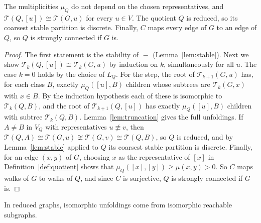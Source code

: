 \documentclass[twoside,leqno]{article}
\newcommand{\Unf}{\mathcal{T}}
\newcommand{\iso}{\cong}
\begin{document}
\begin{lemma}
\label{lem:quotient}
The multiplicities $\mu_Q$ do not depend on the chosen representatives, and $\Unf(Q,[u])\iso\Unf(G,u)$ for every $u \in V$. The quotient $Q$ is reduced, so its coarsest stable partition is discrete. Finally, $C$ maps every edge of $G$ to an edge of $Q$, so $Q$ is strongly connected if $G$ is.
\end{lemma}
\begin{proof}
The first statement is the stability of $\equiv$ (Lemma~\ref{lem:stable}). Next we show $\Unf_k(Q,[u])\iso\Unf_k(G,u)$ by induction on $k$, simultaneously for all $u$. The case $k=0$ holds by the choice of $L_Q$. For the step, the root of $\Unf_{k+1}(G,u)$ has, for each class $B$, exactly $\mu_Q([u],B)$ children whose subtrees are $\Unf_k(G,x)$ with $x\in B$. By the induction hypothesis each of these is isomorphic to $\Unf_k(Q,B)$, and the root of $\Unf_{k+1}(Q,[u])$ has exactly $\mu_Q([u],B)$ children with subtree $\Unf_k(Q,B)$. Lemma~\ref{lem:truncation} gives the full unfoldings. If $A\ne B$ in $V_Q$ with representatives $u\not\equiv v$, then $\Unf(Q,A)\iso\Unf(G,u)\not\iso\Unf(G,v)\iso\Unf(Q,B)$, so $Q$ is reduced, and by Lemma~\ref{lem:stable} applied to $Q$ its coarsest stable partition is discrete. Finally, for an edge $(x,y)$ of $G$, choosing $x$ as the representative of $[x]$ in Definition~\ref{def:quotient} shows that $\mu_Q([x],[y])\ge\mu(x,y)>0$. So $C$ maps walks of $G$ to walks of $Q$, and since $C$ is surjective, $Q$ is strongly connected if $G$ is.
\end{proof}

In reduced graphs, isomorphic unfoldings come from isomorphic reachable subgraphs.
\end{document}
